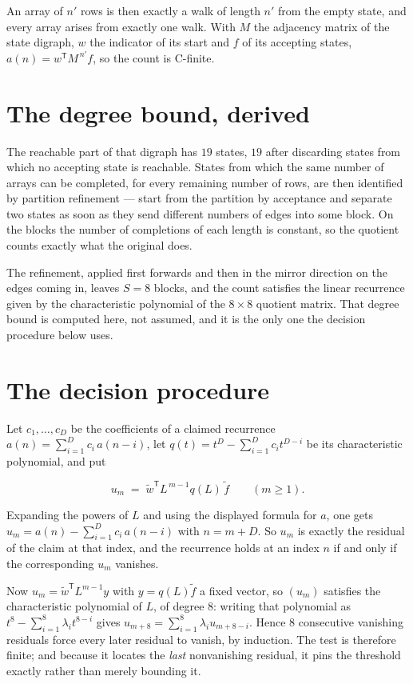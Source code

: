 \documentclass[11pt]{article}
\theoremstyle{definition}
\begin{document}
An array of $n'$ rows is then exactly a walk of length $n'$ from the empty state, and every array arises from exactly one walk. With $M$ the adjacency matrix of the state digraph, $w$ the indicator of its start and $f$ of its accepting states, $a(n) = w^{\mathsf T}M^{\,n'}f$, so the count is C-finite.

\section{The degree bound, derived}

The reachable part of that digraph has $19$ states, $19$ after discarding states from which no accepting state is reachable. States from which the same number of arrays can be completed, for every remaining number of rows, are then identified by partition refinement --- start from the partition by acceptance and separate two states as soon as they send different numbers of edges into some block. On the blocks the number of completions of each length is constant, so the quotient counts exactly what the original does.

The refinement, applied first forwards and then in the mirror direction on the edges coming in, leaves $S = 8$ blocks, and the count satisfies the linear recurrence given by the characteristic polynomial of the $8 \times 8$ quotient matrix. That degree bound is computed here, not assumed, and it is the only one the decision procedure below uses.

\section{The decision procedure}

Let $c_1,\dots,c_D$ be the coefficients of a claimed recurrence $a(n) = \sum_{i=1}^{D} c_i\,a(n-i)$, let $q(t) = t^{D} - \sum_{i=1}^{D} c_i t^{D-i}$ be its characteristic polynomial, and put

\[u_m \;=\; \tilde w^{\mathsf T} L^{\,m-1} q(L)\,\tilde f \qquad (m \ge 1).\]

Expanding the powers of $L$ and using the displayed formula for $a$, one gets $u_m = a(n) - \sum_{i=1}^{D} c_i\,a(n-i)$ with $n = m + D$. So $u_m$ is exactly the residual of the claim at that index, and the recurrence holds at an index $n$ if and only if the corresponding $u_m$ vanishes.

Now $u_m = \tilde w^{\mathsf T} L^{m-1} y$ with $y = q(L)\tilde f$ a fixed vector, so $(u_m)$ satisfies the characteristic polynomial of $L$, of degree $8$: writing that polynomial as $t^{8} - \sum_{i=1}^{8} \lambda_i t^{8-i}$ gives $u_{m+8} = \sum_{i=1}^{8} \lambda_i u_{m+8-i}$. Hence $8$ consecutive vanishing residuals force every later residual to vanish, by induction. The test is therefore finite; and because it locates the {\itshape last} nonvanishing residual, it pins the threshold exactly rather than merely bounding it.
\end{document}
